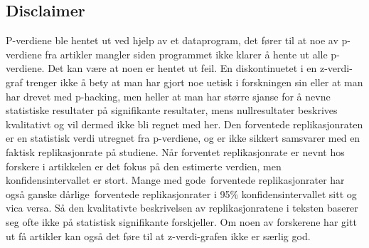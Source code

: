 \documentclass[doc,norsk]{apa7}
\begin{document}
\subsection{Disclaimer}
P-verdiene ble hentet ut ved hjelp av et dataprogram, det fører til at noe av p-verdiene fra artikler mangler siden programmet ikke klarer å hente ut alle p-verdiene. Det kan være at noen er hentet ut feil. En diskontinuetet i en z-verdi-graf trenger ikke å bety at man har gjort noe uetisk i forskningen sin eller at man har drevet med p-hacking, men heller at man har større sjanse for å nevne statistiske resultater på signifikante resultater, mens nullresultater beskrives kvalitativt og vil dermed ikke bli regnet med her. Den forventede replikasjonraten er en statistisk verdi utregnet fra p-verdiene, og er ikke sikkert samsvarer med en faktisk replikasjonrate på studiene. Når forventet replikasjonrate er nevnt hos forskere i artikkelen er det fokus på den estimerte verdien, men konfidensintervallet er stort. Mange med \guillemetleft gode\guillemetright\ forventede replikasjonrater har også ganske \guillemetleft dårlige\guillemetright\ forventede replikasjonrater i 95\% konfidensintervallet sitt og vica versa. Så den kvalitativte beskrivelsen av replikasjonratene i teksten baserer seg ofte ikke på statistisk signifikante forskjeller. Om noen av forskerene har gitt ut få artikler kan også det føre til at z-verdi-grafen ikke er særlig god.

\printbibliography

\processdelayedfloats
\end{document}
